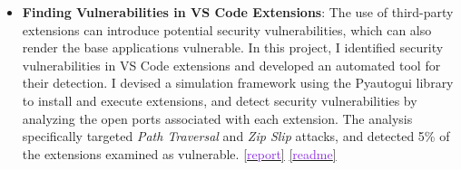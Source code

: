 \begin{itemize}
  \item \textbf{Finding Vulnerabilities in VS Code Extensions}: The use of third-party extensions can introduce 
  potential security vulnerabilities, which can also render the base applications vulnerable. In this project, I identified 
  security vulnerabilities in VS Code extensions and developed an automated tool for their detection. I devised a 
  simulation framework using the Pyautogui library to install and execute extensions, and detect security vulnerabilities 
  by analyzing the open ports associated with each extension. The analysis specifically targeted \textit{Path Traversal} and 
  \textit{Zip Slip} attacks, and detected 5\% of the extensions examined as vulnerable. 
  \href{https://shubhamkaushik.com/assets/pdf/vulnerabilities_in_vs_code.pdf}{[\textcolor{blueviolet}{report}]}
  \href{https://shubhamkaushik.com/projects/heterogeneity_aware_operator_placement_for_stream_processing_systems_at_the_edge/}{[\textcolor{blueviolet}{readme}]}
\end{itemize}




  
